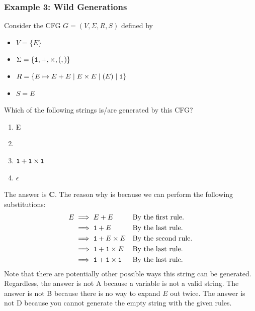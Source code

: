 \documentclass[letterpaper]{article}
\begin{document}
\subsubsection{Example 3: Wild Generations}
Consider the CFG $G = (V, \Sigma, R, S)$ defined by
\begin{itemize}
    \item $V = \{E\}$
    \item $\Sigma = \{\texttt{1}, +, \times, (, )\}$
    \item $R = \{E \mapsto E + E \mid E \times E \mid (E) \mid \texttt{1}\}$
    \item $S = E$
\end{itemize}

Which of the following strings is/are generated by this CFG?
\begin{enumerate}[\hspace{0.5cm}a.]
    \item E
    \item {}
    \item $\texttt{1} + \texttt{1} \times \texttt{1}$
    \item $\epsilon$
\end{enumerate}

\begin{mdframed}[]
    The answer is \textbf{C}. The reason why is because we can perform the following substitutions:
    \begin{equation*}
        \begin{aligned}
            E &\implies E + E && \text{By the first rule.} \\ 
                &\implies \texttt{1} + E && \text{By the last rule.} \\ 
                &\implies \texttt{1} + E \times E && \text{By the second rule.} \\ 
                &\implies \texttt{1} + \texttt{1} \times E && \text{By the last rule.} \\ 
                &\implies \texttt{1} + \texttt{1} \times \texttt{1} && \text{By the last rule.}
        \end{aligned}
    \end{equation*}
    Note that there are potentially other possible ways this string can be generated. Regardless, the answer is not A because a variable is not a valid string. The answer is not B because there is no way to expand $E$ out twice. The answer is not D because you cannot generate the empty string with the given rules. 
\end{mdframed}
\end{document}
